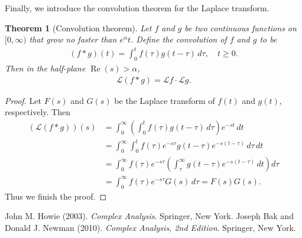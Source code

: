 \documentclass{article}
\numberwithin{equation}{section}
\renewcommand{\cal}{\mathcal}
\DeclareMathOperator{\re}{Re}
\theoremstyle{plain}
\newtheorem{theorem}{Theorem}[section]
\theoremstyle{definition}
\begin{document}
Finally, we introduce the convolution theorem for the Laplace transform.
\begin{theorem}[Convolution theorem]
Let $f$ and $g$ be two continuous functions on $[0,\infty)$ that grow no faster than $e^\alpha t$. Define the convolution of $f$ and $g$ to be
\begin{align*}
	(f*g)(t)=\int_0^t f(\tau)g(t-\tau)\,d\tau,\quad t\geq 0.
\end{align*}
Then in the half-plane $\re(s)>\alpha$,
\begin{align*}
	\cal{L}(f*g)=\cal{L}f\cdot\cal{L}g.
\end{align*}
\end{theorem}
\begin{proof}
Let $F(s)$ and $G(s)$ be the Laplace transform of $f(t)$ and $g(t)$, respectively. Then
\begin{align*}
	(\cal{L}(f*g))(s)&=\int_0^\infty\left(\int_0^t f(\tau)g(t-\tau)\,d\tau\right)e^{-st}\,dt\\
	&=\int_0^\infty\int_0^t f(\tau)e^{-s\tau}g(t-\tau)e^{-s(t-\tau)}\,d\tau\,dt\\
	&=\int_0^\infty f(\tau)e^{-s\tau}\left(\int_\tau^\infty g(t-\tau)e^{-s(t-\tau)}\,dt\right)d\tau\\
	&=\int_0^\infty f(\tau)e^{-s\tau}G(s)\,d\tau=F(s)G(s).
\end{align*}
Thus we finish the proof.
\end{proof}

\newpage
\begin{thebibliography}{100}
 John M. Howie (2003). \textit{Complex Analysis}. Springer, New York.
 Joseph Bak and Donald J. Newman (2010). \textit{Complex Analysis, 2nd Edition}. Springer, New York.
\end{thebibliography}
\end{document}
